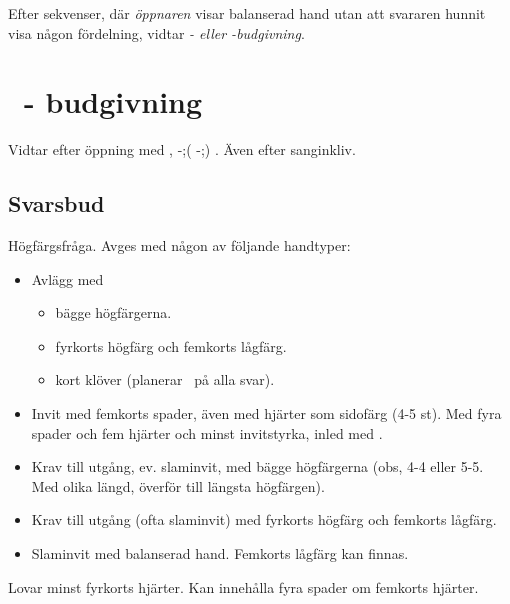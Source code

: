 Efter sekvenser, d\"ar {\em \"oppnaren} visar balanserad hand utan
att svararen hunnit visa n{\aa}gon f\"ordelning, vidtar {\em {}- eller
-budgivning}.

\section{\ - budgivning}

Vidtar efter \"oppning med ,
 -;( -;) . Även efter sang\-in\-kliv. 

\subsection{Svarsbud}
\bbe
  \item[-\kl{2}] H\"ogf\"argsfr{\aa}ga. Avges med n{\aa}gon av f\"oljande
                 handtyper:
         \begin{itemize}
		\item Avl\"agg med
                   \begin{itemize}
                      \item b\"agge h\"ogf\"argerna.
                      \item fyrkorts h\"ogf\"arg och femkorts l{\aa}gf\"arg.
                      \item kort kl\"over (planerar \pass\ p{\aa} alla
                            svar).
                   \end{itemize}
                 \item Invit med femkorts spader, \"aven med hj\"arter
                       som sidof\"arg (4-5 st).
                       Med fyra spader och fem hj\"arter och minst invitstyrka,
                       inled med .
                 \item Krav till utg{\aa}ng, ev. slaminvit, med b\"agge
                       h\"ogf\"argerna (obs, 4-4 eller 5-5. Med olika
                       l\"angd, \"overf\"or till l\"angsta h\"ogf\"argen).
                 \item Krav till utg{\aa}ng (ofta slaminvit) med fyrkorts 
                       h\"ogf\"arg och femkorts l{\aa}gf\"arg.
                 \item Slaminvit med balanserad hand. Femkorts
                       l{\aa}gf\"arg kan finnas.
		\end{itemize}
  \item[-\ru{2}] Lovar minst fyrkorts hj\"arter. Kan inneh{\aa}lla fyra
                   spader om femkorts hj\"arter. 

